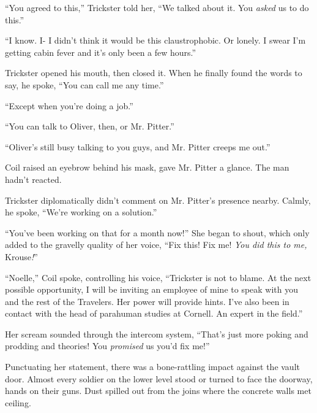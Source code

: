 ``You agreed to this,'' Trickster told her, ``We talked about it.  You \emph{asked} us to do this.''



``I know.  I-  I didn't think it would be this claustrophobic.  Or lonely.  I swear I'm getting cabin fever and it's only been a few hours.''



Trickster opened his mouth, then closed it.  When he finally found the words to say, he spoke, ``You can call me any time.''



``Except when you're doing a job.''



``You can talk to Oliver, then, or Mr. Pitter.''



``Oliver's still busy talking to you guys, and Mr. Pitter creeps me out.''



Coil raised an eyebrow behind his mask, gave Mr. Pitter a glance.  The man hadn't reacted.



Trickster diplomatically didn't comment on Mr. Pitter's presence nearby.  Calmly, he spoke, ``We're working on a solution.''



``You've been working on that for a month now!''  She began to shout, which only added to the gravelly quality of her voice, ``Fix this!  Fix me!  \emph{You did this to me, }Krouse\emph{!}''



``Noelle,'' Coil spoke, controlling his voice, ``Trickster is not to blame.  At the next possible opportunity, I will be inviting an employee of mine to speak with you and the rest of the Travelers.  Her power will provide hints.  I've also been in contact with the head of parahuman studies at Cornell.  An expert in the field.''



Her scream sounded through the intercom system, ``That's just more poking and prodding and theories!  You \emph{promised} us you'd fix me!''



Punctuating her statement, there was a bone-rattling impact against the vault door.  Almost every soldier on the lower level stood or turned to face the doorway, hands on their guns.  Dust spilled out  from the joins where the concrete walls met ceiling.



